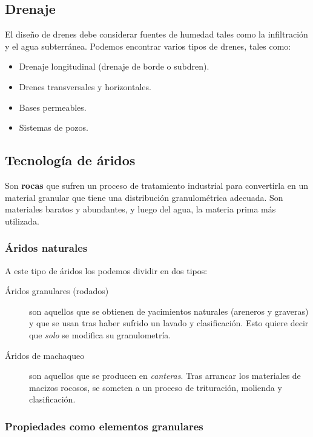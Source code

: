 \documentclass[../main.tex]{subfiles}
\begin{document}
\subsection{Drenaje}

El diseño de drenes debe considerar fuentes de humedad tales como la 
infiltración y el agua subterránea. Podemos encontrar varios tipos de drenes,
tales como:

\begin{itemize}
  \item Drenaje longitudinal (drenaje de borde o subdren).
  \item Drenes transversales y horizontales.
  \item Bases permeables.
  \item Sistemas de pozos.
\end{itemize}


\subsection{Tecnología de áridos}

Son \textbf{rocas} que sufren un proceso de tratamiento industrial para
convertirla en un material granular que tiene una distribución granulométrica
adecuada. Son materiales baratos y abundantes, y luego del agua, la materia
prima más utilizada.

\subsubsection{Áridos naturales}

A este tipo de áridos los podemos dividir en dos tipos:

\begin{description}
  \item[Áridos granulares (rodados)] son aquellos que se obtienen de yacimientos
    naturales (areneros y graveras) y que se usan tras haber sufrido un lavado y
    clasificación. Esto quiere decir que \textit{solo} se modifica su granulometría.

  \item[Áridos de machaqueo] son aquellos que se producen en \textit{canteras}.
    Tras arrancar los materiales de macizos rocosos, se someten a un proceso
    de trituración, molienda y clasificación. 
\end{description}

\subsubsection{Propiedades como elementos granulares}
\end{document}
